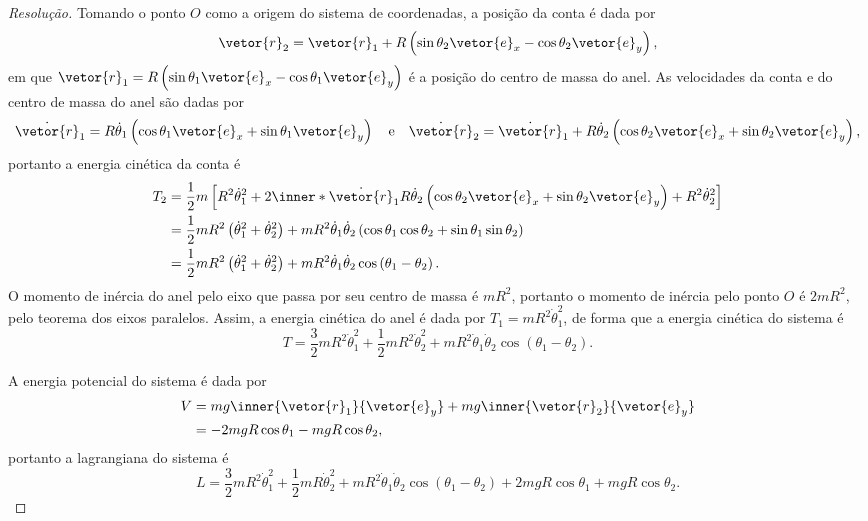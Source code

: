 \begin{proof}[Resolução]
    Tomando o ponto \(O\) como a origem do sistema de coordenadas, a posição da conta é dada por
    \begin{equation*}
        \vetor{r}_2 = \vetor{r}_1 + R\left(\sin\theta_2\vetor{e}_x - \cos\theta_2 \vetor{e}_y\right),
    \end{equation*}
    em que \(\vetor{r}_1 = R\left(\sin\theta_1\vetor{e}_x - \cos\theta_1\vetor{e}_y\right)\) é a posição do centro de massa do anel. As velocidades da conta e do centro de massa do anel são dadas por
    \begin{equation*}
        \dot{\vetor{r}}_1 = R\dot\theta_1\left(\cos\theta_1\vetor{e}_x + \sin\theta_1\vetor{e}_y\right)\quad\text{e}\quad\dot{\vetor{r}}_2 = \dot{\vetor{r}}_1 + R\dot\theta_2\left(\cos\theta_2\vetor{e}_x + \sin\theta_2\vetor{e}_y\right),
    \end{equation*}
    portanto a energia cinética da conta é
    \begin{align*}
        T_2 &= \frac12 m \left[R^2\dot\theta_1^2 + 2\inner*{\dot{\vetor{r}}_1}{R\dot\theta_2\left(\cos\theta_2\vetor{e}_x + \sin\theta_2\vetor{e}_y\right)} + R^2\dot\theta_2^2\right]\\
        &= \frac12 m R^2\left(\dot\theta_1^2 + \dot\theta_2^2\right) + mR^2\dot\theta_1\dot\theta_2 \left(\cos\theta_1\cos\theta_2 + \sin\theta_1 \sin\theta_2\right)\\
        &= \frac12 m R^2\left(\dot\theta_1^2 + \dot\theta_2^2\right) + mR^2\dot\theta_1\dot\theta_2 \cos\left(\theta_1-\theta_2\right).
    \end{align*}
    O momento de inércia do anel pelo eixo que passa por seu centro de massa é \(mR^2\), portanto o momento de inércia pelo ponto \(O\) é \(2mR^2\), pelo teorema dos eixos paralelos. Assim, a energia cinética do anel é dada por \(T_1 = mR^2\dot\theta_1^2\), de forma que a energia cinética do sistema é
    \begin{equation*}
        T = \frac32 m R^2\dot\theta_1^2 + \frac12 m R^2\dot\theta_2^2+ mR^2\dot\theta_1\dot\theta_2 \cos\left(\theta_1-\theta_2\right).
    \end{equation*}

    A energia potencial do sistema é dada por
    \begin{align*}
        V &= mg \inner{\vetor{r}_1}{\vetor{e}_y} + mg\inner{\vetor{r}_2}{\vetor{e}_y}\\
          &= -2 mgR \cos\theta_1 - mgR \cos\theta_2,
    \end{align*}
    portanto a lagrangiana do sistema é
    \begin{equation*}
        L = \frac32 mR^2\dot\theta_1^2 + \frac12 mR\dot\theta_2^2 + m R^2\dot\theta_1\dot\theta_2\cos{(\theta_1 - \theta_2)} + 2mgR \cos\theta_1 + mgR\cos\theta_2.
    \end{equation*}


\end{proof}
